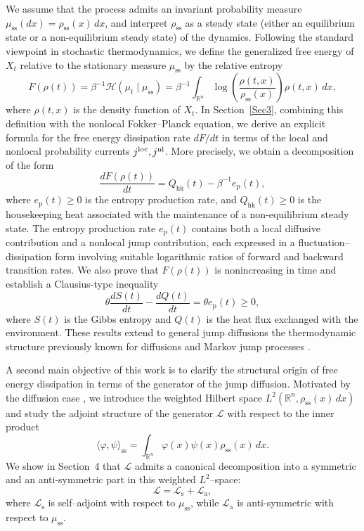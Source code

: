 \documentclass[10pt]{article}
\theoremstyle{definition}
\numberwithin{equation}{section}
\begin{document}
We assume that the process admits an invariant probability measure $\mu_\mathrm{ss}(dx)=\rho_\mathrm{ss}(x)\,dx$, and interpret $\rho_\mathrm{ss}$ as a steady state (either an equilibrium state or a non-equilibrium steady state) of the dynamics. 
Following the standard viewpoint in stochastic thermodynamics, we define the generalized free energy of $X_t$ relative to the stationary measure $\mu_\mathrm{ss}$ by the relative entropy
\[
F(\rho(t)) 
= \beta^{-1}\mathcal{H}(\mu_t\mid\mu_\mathrm{ss})
= \beta^{-1}\int_{\mathbb{R}^n} \log\left(\frac{\rho(t,x)}{\rho_\mathrm{ss}(x)}\right)\rho(t,x)\,dx,
\]
where $\rho(t,x)$ is the density function of $X_t$. In Section~\ref{Sec3}, combining this definition with the nonlocal Fokker–Planck equation, we derive an explicit formula for the free energy dissipation rate $dF/dt$ in terms of the local and nonlocal probability currents $j^{\rm loc}, j^{\rm nl}$. 
More precisely, we obtain a decomposition of the form
\[
\frac{dF(\rho(t))}{dt}
= Q_\mathrm{hk}(t) - \beta^{-1} e_\mathrm{p}(t),
\]
where $e_\mathrm{p}(t)\ge0$ is the entropy production rate, and $Q_\mathrm{hk}(t)\ge0$ is the housekeeping heat associated with the maintenance of a non-equilibrium steady state. 
The entropy production rate $e_\mathrm{p}(t)$ contains both a local diffusive contribution and a nonlocal jump contribution, each expressed in a fluctuation–dissipation form involving suitable logarithmic ratios of forward and backward transition rates. 
We also prove that $F(\rho(t))$ is nonincreasing in time and establish a Clausius-type inequality
\[
\theta\frac{dS(t)}{dt} - \frac{dQ(t)}{dt} = \theta e_\mathrm{p}(t)\ge 0,
\]
where $S(t)$ is the Gibbs entropy and $Q(t)$ is the heat flux exchanged with the environment. 
These results extend to general jump diffusions the thermodynamic structure previously known for diffusions and Markov jump processes \cite{EV10,VE10,MN03,MNW08,ZL25}.

A second main objective of this work is to clarify the structural origin of free energy dissipation in terms of the generator of the jump diffusion. 
Motivated by the diffusion case \cite{Q13,DP23,ZL25}, we introduce the weighted Hilbert space $L^2(\mathbb{R}^n,\rho_\mathrm{ss}(x)\,dx)$ and study the adjoint structure of the generator $\mathcal{L}$ with respect to the inner product
\[
\langle \varphi,\psi\rangle_\mathrm{ss}
= \int_{\mathbb{R}^n}\varphi(x)\psi(x)\rho_\mathrm{ss}(x)\,dx.
\]
We show in Section~4 that $\mathcal{L}$ admits a canonical decomposition into a symmetric and an anti-symmetric part in this weighted $L^2$–space:
\[
\mathcal{L} = \mathcal{L}_\mathrm{s} + \mathcal{L}_\mathrm{a},
\]
where $\mathcal{L}_\mathrm{s}$ is self–adjoint with respect to $\mu_\mathrm{ss}$, while $\mathcal{L}_\mathrm{a}$ is anti-symmetric with respect to $\mu_\mathrm{ss}$. 
\end{document}
